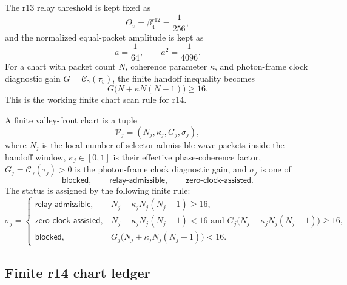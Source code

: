 The r13 relay threshold is kept fixed as
\[
\Theta_v=\beta_4^{r12}=\frac1{256},
\]
and the normalized equal-packet amplitude is kept as
\[
a=\frac1{64},\qquad a^2=\frac1{4096}.
\]
For a chart with packet count \(N\), coherence parameter \(\kappa\), and
photon-frame clock diagnostic gain \(G=\mathcal C_\gamma(\tau_v)\), the finite
handoff inequality becomes
\[
G\bigl(N+\kappa N(N-1)\bigr)\geq 16.
\]
This is the working finite chart scan rule for r14.

\begin{definition}
\label{def:v470-r14-finite-valley-front-chart}
A finite valley-front chart is a tuple
\[
\mathcal V_j=(N_j,\kappa_j,G_j,\sigma_j),
\]
where \(N_j\) is the local number of selector-admissible wave packets inside the
handoff window, \(\kappa_j\in[0,1]\) is their effective phase-coherence factor,
\(G_j=\mathcal C_\gamma(\tau_j)>0\) is the photon-frame clock diagnostic gain,
and \(\sigma_j\) is one of
\[
\mathsf{blocked},\qquad
\mathsf{relay\mbox{-}admissible},\qquad
\mathsf{zero\mbox{-}clock\mbox{-}assisted}.
\]
The status is assigned by the following finite rule:
\[
\sigma_j=
\begin{cases}
\mathsf{relay\mbox{-}admissible},
& N_j+\kappa_jN_j(N_j-1)\geq 16,\\
\mathsf{zero\mbox{-}clock\mbox{-}assisted},
& N_j+\kappa_jN_j(N_j-1)<16
\text{ and }G_j\bigl(N_j+\kappa_jN_j(N_j-1)\bigr)\geq16,\\
\mathsf{blocked},&
G_j\bigl(N_j+\kappa_jN_j(N_j-1)\bigr)<16.
\end{cases}
\]
\end{definition}

\subsection{Finite r14 chart ledger}
\label{subsec:v470-r14-finite-chart-ledger}

